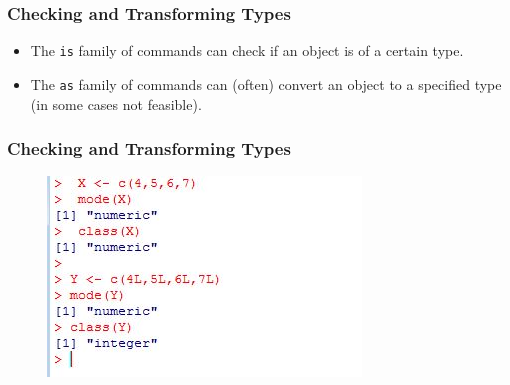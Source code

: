 \documentclass{beamer}
\begin{document}
 		\begin{frame}
 			\frametitle{Checking and Transforming Types}	
 			
 			\begin{itemize}
 			\item The \texttt{is} family of commands can check if an object is of a certain type.

\item The \texttt{as} family of commands can (often) convert an object to a specified type (in some cases not feasible). 			
\end{itemize}
 		\end{frame}
 		
 		
 		\begin{frame}
 				\frametitle{Checking and Transforming Types}	
 			\begin{figure}
 				\centering
 				\includegraphics[width=1.2\linewidth]{images/numerictypes}    
 			\end{figure}
 		\end{frame} 
\end{document}
